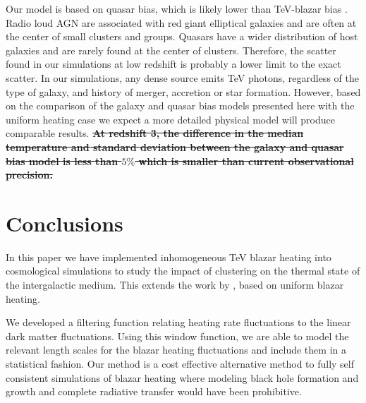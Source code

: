\documentclass[numberedappendix]{emulateapj}
\newcommand\ALc[1]{{\color{red} \bf #1}} %
\begin{document}
Our model is based on quasar bias, which is likely lower than TeV-blazar bias \citep{2014ApJ...797...96A}. Radio loud AGN are associated with red giant elliptical galaxies \citep{2007A&A...476..723H} and are often at the center of small clusters and groups. Quasars have a wider distribution of host galaxies and are rarely found at the center of clusters. Therefore, the scatter found in our simulations at low redshift is probably a lower limit to the exact scatter. In our simulations, any dense source emits TeV photons, regardless of the type of galaxy, and history of merger, accretion or star formation. However, based on the comparison of the galaxy and quasar bias models presented here with the uniform heating case we expect a more detailed physical model will produce comparable results. \ALc{\sout{At redshift 3, the difference in the median temperature and standard deviation between the galaxy and quasar bias model is less than $5\%$ which is smaller than current observational precision.}}
\section{Conclusions}
In this paper we have implemented inhomogeneous TeV blazar heating into cosmological simulations to study the impact of clustering on the thermal state of the intergalactic medium. This extends the work by \citet{2012ApJ...752...23C,2012MNRAS.423..149P}, based on uniform blazar heating.

We developed a filtering function relating heating rate fluctuations to the linear dark matter fluctuations. Using this window function, we are able to model the relevant length scales for the blazar heating fluctuations and include them in a statistical fashion. Our method is a cost effective alternative method to fully self consistent simulations of blazar heating where modeling black hole formation and growth and complete radiative transfer would have been prohibitive.
\end{document}
